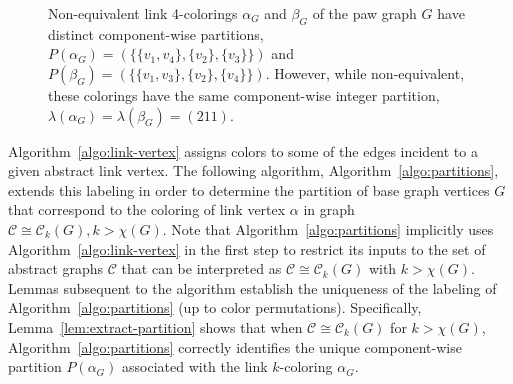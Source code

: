 \documentclass{amsart}
\theoremstyle{hypothesisstyle}
\newcommand{\set}[1]{\{#1\}}
\theoremstyle{definition}
\theoremstyle{remark}
\numberwithin{equation}{section}
\newcommand{\C}{\mathcal C}
\begin{document}
\begin{figure}[ht]
\begin{center}
\hspace{6em}
\end{center}
    \caption{Non-equivalent link 4-colorings $\alpha_G$ and $\beta_G$ of the paw graph $G$ have distinct component-wise partitions, $P(\alpha_G)=(\set{\set{v_1,v_4},\set{v_2},\set{v_3}})$ and $P(\beta_G)=(\set{\set{v_1,v_3},\set{v_2},\set{v_4}})$.  However, while non-equivalent, these colorings have the same component-wise integer partition, $\lambda(\alpha_G)=\lambda(\beta_G)=(211)$.}\label{fig:paw}
\end{figure}

Algorithm~\ref{algo:link-vertex} assigns colors to some of the edges incident to a given abstract link vertex. The following algorithm, Algorithm~\ref{algo:partitions}, extends this labeling in order to determine the partition of base graph vertices $G$ that correspond to the coloring of link vertex $\alpha$ in graph $\mathcal C\cong \mathcal C_k(G),k>\chi(G)$. Note that Algorithm~\ref{algo:partitions} implicitly uses Algorithm~\ref{algo:link-vertex} in the first step to restrict its inputs to the set of abstract graphs $\mathcal C$ that can be interpreted as $\C\cong\C_k(G)$ with $k>\chi(G)$. Lemmas subsequent to the algorithm establish the uniqueness of the labeling of Algorithm~\ref{algo:partitions} (up to color permutations). Specifically, Lemma~\ref{lem:extract-partition} shows that when $\C\cong\C_k(G)$ for $k>\chi(G)$, Algorithm~\ref{algo:partitions} correctly identifies the unique component-wise partition $P(\alpha_G)$ associated with the link $k$-coloring $\alpha_G$. 
\end{document}
